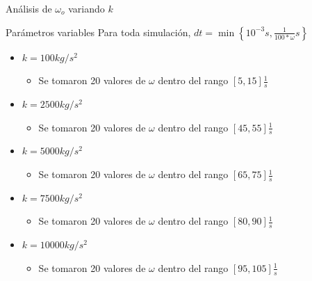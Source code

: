 \begin{frame}{Análisis de $\omega_o$ variando $k$}
    \begin{block}{Parámetros variables}
        Para toda simulación, $dt = \min\left\{10^{-3}s, \frac{1}{100*\omega}s\right\}$
        \begin{itemize}
            \item $k=100 kg/s^2 $
                \begin{itemize}
                    \item Se tomaron 20 valores de $\omega$ dentro del rango $[5, 15] \frac{1}{s}$
                \end{itemize}
            \item $k=2500 kg/s^2$
                \begin{itemize}
                    \item Se tomaron 20 valores de $\omega$ dentro del rango $[45, 55] \frac{1}{s}$
                \end{itemize}
            \item $k=5000 kg/s^2$
                \begin{itemize}
                    \item Se tomaron 20 valores de $\omega$ dentro del rango $[65, 75] \frac{1}{s}$
                \end{itemize}
            \item $k=7500 kg/s^2$
                \begin{itemize}
                    \item Se tomaron 20 valores de $\omega$ dentro del rango $[80, 90] \frac{1}{s}$
                \end{itemize}
            \item $k=10000 kg/s^2$
                \begin{itemize}
                    \item Se tomaron 20 valores de $\omega$ dentro del rango $[95, 105] \frac{1}{s}$
                \end{itemize}
        \end{itemize}
    \end{block}
\end{frame}

